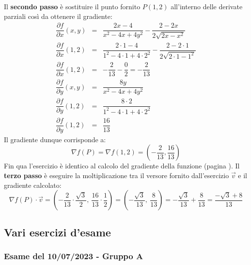 \documentclass[a4paper]{article}
\begin{document}
	\noindent
	Il \textbf{secondo passo} è sostituire il punto fornito $P\left(1,2\right)$ all'interno delle derivate parziali così da ottenere il gradiente:
	\begin{equation*}
		\begin{array}{rcl}
			\dfrac{\partial f}{\partial x}\left(x,y\right) &=& \dfrac{2x - 4}{x^{2}-4x+4y^{2}} - \dfrac{2-2x}{2\sqrt{2x-x^{2}}} \\ [1.5em]
			\dfrac{\partial f}{\partial x}\left(1,2\right) &=& \dfrac{2 \cdot 1 - 4}{1^{2}-4 \cdot 1+4 \cdot 2^{2}} - \dfrac{2-2 \cdot 1}{2\sqrt{2 \cdot 1- 1^{2}}} \\ [1.5em]
			\dfrac{\partial f}{\partial x}\left(1,2\right) &=& -\dfrac{2}{13} - \dfrac{0}{2} = -\dfrac{2}{13} \\ [2.5em]
			\dfrac{\partial f}{\partial y}\left(x,y\right) &=& \dfrac{8y}{x^{2} - 4x + 4y^{2}} \\ [1.5em]
			\dfrac{\partial f}{\partial y}\left(1,2\right) &=& \dfrac{8 \cdot 2}{1^{2} - 4 \cdot 1 + 4 \cdot 2^{2}} \\ [1.5em]
			\dfrac{\partial f}{\partial y}\left(1,2\right) &=& \dfrac{16}{13}
		\end{array}
	\end{equation*}
	Il gradiente dunque corrisponde a:
	\begin{equation*}
		\nabla f\left(P\right) = \nabla f\left(1,2\right) = \left(-\dfrac{2}{13}, \dfrac{16}{13}\right)
	\end{equation*}
	Fin qua l'esercizio è identico al calcolo del gradiente della funzione (pagina \pageref{par: calcolare il gradiente della funzione}). Il \textbf{terzo passo} è eseguire la moltiplicazione tra il versore fornito dall'esercizio $\overrightarrow{v}$ e il gradiente calcolato:
	\begin{equation*}
		\nabla f\left(P\right) \cdot \overrightarrow{v} = \left(-\dfrac{2}{13} \cdot \dfrac{\sqrt{3}}{2}, \: \dfrac{16}{13} \cdot \dfrac{1}{2}\right) = \left(-\dfrac{\sqrt{3}}{13}, \: \dfrac{8}{13}\right) = -\dfrac{\sqrt{3}}{13} + \dfrac{8}{13} = \dfrac{-\sqrt{3} + 8}{13}
	\end{equation*}\newpage

	\subsection{Vari esercizi d'esame}

	\subsubsection{Esame del 10/07/2023 - Gruppo A}
\end{document}
